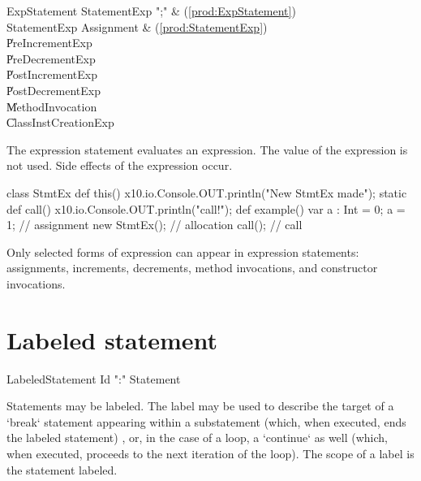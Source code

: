 \begin{bbgrammar}
 ExpStatement    \: StatementExp \xcd";" & (\ref{prod:ExpStatement})\\%
 StatementExp    \: Assignment & (\ref{prod:StatementExp})\\%
    \| PreIncrementExp\\
    \| PreDecrementExp\\
    \| PostIncrementExp\\
    \| PostDecrementExp\\
    \| MethodInvocation\\
    \| ClassInstCreationExp\\

\end{bbgrammar}


The expression statement evaluates an expression.  The value of the expression
is not used.
Side effects of the expression occur.  
\begin{xten}
class StmtEx {
  def this() { x10.io.Console.OUT.println("New StmtEx made");  }
  static def call() { x10.io.Console.OUT.println("call!");  }
  def example() {
     var a : Int = 0;
     a = 1; // assignment
     new StmtEx(); // allocation
     call(); // call
  }
}
\end{xten}
%
Only selected forms of expression can appear in expression
statements: assignments, increments, decrements, method invocations, and
constructor invocations. 


\section{Labeled statement}


\begin{bbgrammar}
 LabeledStatement    \: Id \xcd":" Statement 
\end{bbgrammar}


Statements may be labeled. The label may be used to describe the target of a
\xcd`break` statement appearing within a substatement (which, when executed,
ends the labeled statement) , or, in the case of a loop, a \xcd`continue` as
well (which, when executed, proceeds to the next iteration of the loop). The
scope of a label is the statement labeled.


